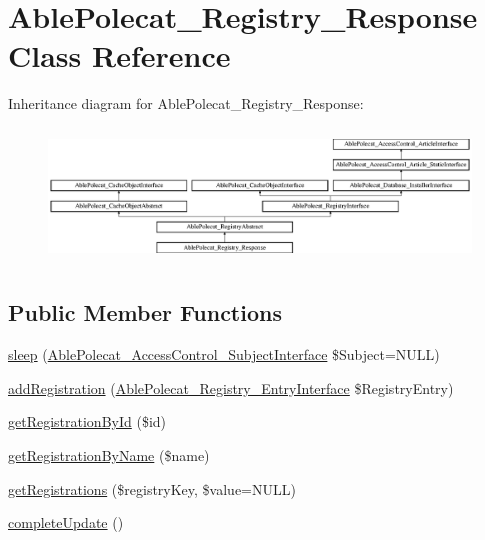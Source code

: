 \hypertarget{class_able_polecat___registry___response}{}\section{Able\+Polecat\+\_\+\+Registry\+\_\+\+Response Class Reference}
\label{class_able_polecat___registry___response}
Inheritance diagram for Able\+Polecat\+\_\+\+Registry\+\_\+\+Response\+:\begin{figure}[H]
\begin{center}
\leavevmode
\includegraphics[height=3.612903cm]{class_able_polecat___registry___response}
\end{center}
\end{figure}
\subsection*{Public Member Functions}
\begin{DoxyCompactItemize}
\item 
\hyperlink{class_able_polecat___registry___response_a365e24d7b066205cafa2a5cce3a4f224}{sleep} (\hyperlink{interface_able_polecat___access_control___subject_interface}{Able\+Polecat\+\_\+\+Access\+Control\+\_\+\+Subject\+Interface} \$Subject=N\+U\+L\+L)
\item 
\hyperlink{class_able_polecat___registry___response_a22d8ddb551ccf544f1d2615db68ca9b1}{add\+Registration} (\hyperlink{interface_able_polecat___registry___entry_interface}{Able\+Polecat\+\_\+\+Registry\+\_\+\+Entry\+Interface} \$Registry\+Entry)
\item 
\hyperlink{class_able_polecat___registry___response_a06a999816a4143bb407c09628018a874}{get\+Registration\+By\+Id} (\$id)
\item 
\hyperlink{class_able_polecat___registry___response_a11594a43c95ab62b4841717c17cf0e54}{get\+Registration\+By\+Name} (\$name)
\item 
\hyperlink{class_able_polecat___registry___response_a8ed45a29bdb30603896e12d7bbf208b5}{get\+Registrations} (\$registry\+Key, \$value=N\+U\+L\+L)
\item 
\hyperlink{class_able_polecat___registry___response_a363ee22699ad46520333ef24f64798bb}{complete\+Update} ()
\end{DoxyCompactItemize}
